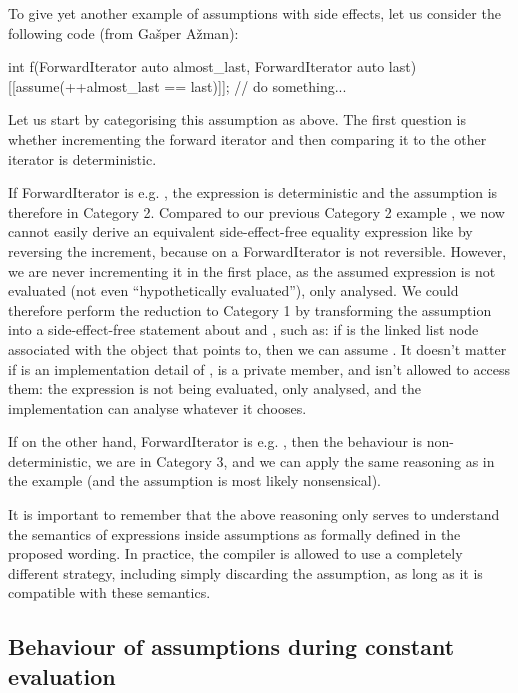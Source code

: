 To give yet another example of assumptions with side effects, let us consider the following code (from Ga\v sper A\v zman):

\begin{codeblock}
int f(ForwardIterator auto almost_last, ForwardIterator auto last) {
  [[assume(++almost_last == last)]];
  // do something...
}
\end{codeblock}

Let us start by categorising this assumption as above. The first question is whether incrementing the forward iterator and then comparing it to the other iterator is deterministic.

If ForwardIterator is e.g. , the expression is deterministic and the assumption is therefore in Category 2. Compared to our previous Category 2 example \tcode{[[assume(++i  == 43)]]}, we now cannot easily derive an equivalent side-effect-free equality expression like \tcode{[[assume(i == 42)]]} by reversing the increment, because  on a ForwardIterator is not reversible. However, we are never incrementing it in the first place, as the assumed expression is not evaluated (not even ``hypothetically evaluated''), only analysed. We could therefore perform the reduction to Category 1 by transforming the assumption into a side-effect-free statement about  and , such as: if  is the linked list node associated with the object that  points to, then we can assume . It doesn’t matter if  is an implementation detail of ,  is a private member, and  isn’t allowed to access them: the expression is not being evaluated, only analysed, and the implementation can analyse whatever it chooses.

If on the other hand, ForwardIterator is e.g. , then the behaviour is non-deterministic, we are in Category 3, and we can apply the same reasoning as in the  example (and the assumption is most likely nonsensical).

It is important to remember that the above reasoning only serves to understand the semantics of expressions inside assumptions as formally defined in the proposed wording. In practice, the compiler is allowed to use a completely different strategy, including simply discarding the assumption, as long as it is compatible with these semantics.

\subsection{Behaviour of assumptions during constant evaluation}

